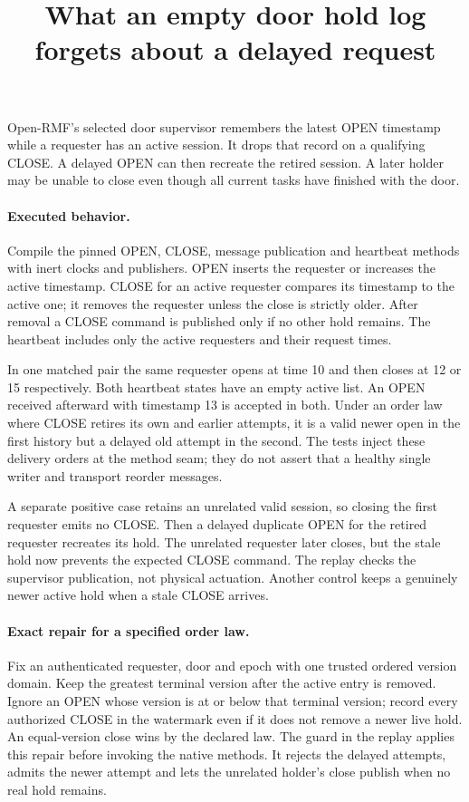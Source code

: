 \documentclass[11pt]{article}
\title{What an empty door hold log forgets about a delayed request}
\begin{document}
\maketitle

Open-RMF's selected door supervisor remembers the latest OPEN
timestamp while a requester has an active session. It drops that
record on a qualifying CLOSE. A delayed OPEN can then recreate
the retired session. A later holder may be unable to close even
though all current tasks have finished with the door.

\paragraph{Executed behavior.}
Compile the pinned OPEN, CLOSE, message publication and heartbeat
methods with inert clocks and publishers. OPEN inserts the requester
or increases the active timestamp. CLOSE for an active requester
compares its timestamp to the active one; it removes the requester
unless the close is strictly older. After removal a CLOSE command is
published only if no other hold remains. The heartbeat includes only
the active requesters and their request times.

In one matched pair the same requester opens at time 10 and then
closes at 12 or 15 respectively. Both heartbeat states have an
empty active list. An OPEN received afterward with timestamp 13
is accepted in both. Under an order law where CLOSE retires its
own and earlier attempts, it is a valid newer open in the first
history but a delayed old attempt in the second.
The tests inject these delivery orders at the method seam; they
do not assert that a healthy single writer and transport reorder
messages.

A separate positive case retains an unrelated valid session, so
closing the first requester emits no CLOSE. Then a delayed
duplicate OPEN for the retired requester recreates its hold.
The unrelated requester later closes, but the stale hold now
prevents the expected CLOSE command. The replay checks the
supervisor publication, not physical actuation. Another control
keeps a genuinely newer active hold when a stale CLOSE arrives.

\paragraph{Exact repair for a specified order law.}
Fix an authenticated requester, door and epoch with one trusted
ordered version domain. Keep the greatest terminal version after
the active entry is removed. Ignore an OPEN whose version is at
or below that terminal version; record every authorized CLOSE
in the watermark even if it does not remove a newer live hold.
An equal-version close wins by the declared law. The guard in the
replay applies this repair before invoking the native methods.
It rejects the delayed attempts, admits the newer attempt and
lets the unrelated holder's close publish when no real hold
remains.
\end{document}
